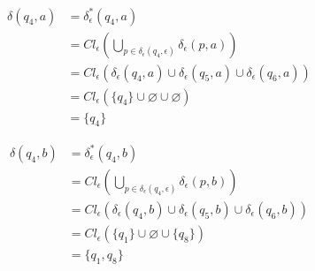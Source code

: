 \documentclass{article}
\begin{document}
\begin{enumerate}
{\begin{enumerate}
{					\begin{align*}
						\delta(q_{4}, a) &= \delta^{*}_{\epsilon}(q_{4}, a) \\
						&= Cl_{\epsilon}(\bigcup_{p \in \delta_{\epsilon}(q_{4}, \epsilon)}
						{\delta_{\epsilon}(p, a)}) \\
						&= Cl_{\epsilon}(\delta_{\epsilon}(q_{4}, a) 
						\cup \delta_{\epsilon}(q_{5}, a)
						\cup \delta_{\epsilon}(q_{6}, a))\\
						&= Cl_{\epsilon}(\{q_{4}\} \cup \varnothing \cup \varnothing)\\
						&= \{q_{4}\}
					\end{align*}

					\begin{align*}
						\delta(q_{4}, b) &= \delta^{*}_{\epsilon}(q_{4}, b) \\
						&= Cl_{\epsilon}(\bigcup_{p \in \delta_{\epsilon}(q_{4}, \epsilon)}
						{\delta_{\epsilon}(p, b)}) \\
						&= Cl_{\epsilon}(\delta_{\epsilon}(q_{4}, b) 
						\cup \delta_{\epsilon}(q_{5}, b)
						\cup \delta_{\epsilon}(q_{6}, b))\\
						&= Cl_{\epsilon}(\{q_{1}\} \cup \varnothing \cup \{q_{8}\})\\
						&= \{q_{1}, q_{8}\}
					\end{align*}

				}
    		\end{enumerate}
    	}
    \end{enumerate}
\end{document}
